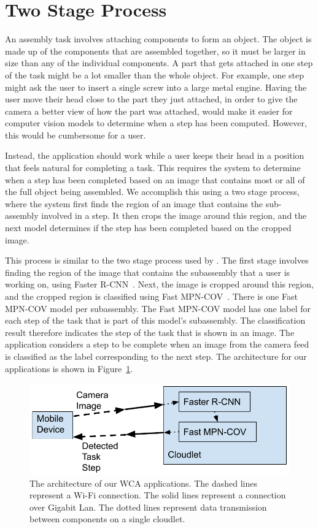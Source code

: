 \section{Two Stage Process}\label{sec:two_stage}

An assembly task involves attaching components to form an object.
The object is made up of the components that are assembled together, so it must
be larger in size than any of the individual components.
A part that gets attached in one step of the task might be a lot smaller than
the whole object.
For example, one step might ask the user to insert a single screw into a large
metal engine.
Having the user move their head close to the part they just attached, in order
to give the camera a better view of how the part was attached, would make it
easier for computer vision models to determine when a step has been computed.
However, this would be cumbersome for a user.

Instead, the application should work while a user keeps their head in a position
that feels natural for completing a task.
This requires the system to determine when a step has been
completed based on an image that contains most or all of the full object being
assembled.
We accomplish this using a two stage process, where the system first finds the
region of an image that contains the sub-assembly involved in a step.
It then
crops the image around this region, and the next model determines if the step
has been completed based on the cropped image.

This process is similar to the two stage process used by
\citet{gebru2017finegrained}.
The first stage involves finding the region of the
image that contains the subassembly that a user is working on, using Faster
R-CNN~\cite{frcnn}.
Next, the image is cropped around this region, and the cropped region is
classified using Fast MPN-COV~\cite{Li_2018_CVPR}.
There is one Fast MPN-COV model per subassembly.
The Fast MPN-COV model has one label for each step of the task that is part of
this model's subassembly.
The classification result therefore indicates the step of the task that is shown
in an image.
The application considers a step to be complete when an image from the camera
feed is classified as the label corresponding to the next step.
The architecture for our applications is shown in Figure~\ref{fig:arch}.

\begin{figure}
  \includegraphics[width=\columnwidth]{figures/architecture.pdf}
  \caption{
    The architecture of our WCA applications.
    The dashed lines represent a Wi-Fi connection.
    The solid lines represent a connection over Gigabit Lan.
    The dotted lines represent data transmission between components on a single
    cloudlet.
  }\label{fig:arch}
\end{figure}

